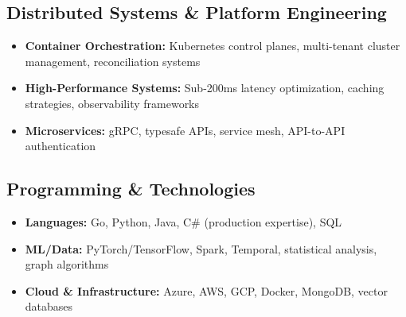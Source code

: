 \documentclass[11pt,letterpaper]{article}
\begin{document}
\subsection{Distributed Systems \& Platform Engineering}
\begin{itemize}[leftmargin=*,noitemsep]
    \item \textbf{Container Orchestration:} Kubernetes control planes, multi-tenant cluster management, reconciliation systems
    \item \textbf{High-Performance Systems:} Sub-200ms latency optimization, caching strategies, observability frameworks
    \item \textbf{Microservices:} gRPC, typesafe APIs, service mesh, API-to-API authentication
\end{itemize}

\subsection{Programming \& Technologies}
\begin{itemize}[leftmargin=*,noitemsep]
    \item \textbf{Languages:} Go, Python, Java, C\# (production expertise), SQL
    \item \textbf{ML/Data:} PyTorch/TensorFlow, Spark, Temporal, statistical analysis, graph algorithms
    \item \textbf{Cloud \& Infrastructure:} Azure, AWS, GCP, Docker, MongoDB, vector databases
\end{itemize}
\end{document}
